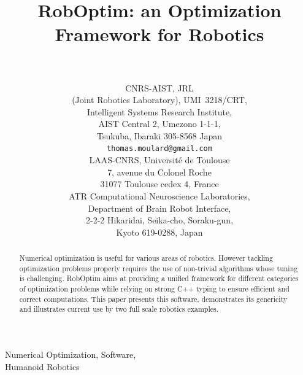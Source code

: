 \documentclass[conference,final,a4paper,twocolumn,9pt]{IEEEtran}
\begin{document}
\title{RobOptim: an Optimization Framework for Robotics}
%
\author{
\\
  \parbox{.32\linewidth}{\centering%
    CNRS-AIST, JRL\\
    (Joint Robotics Laboratory), \mbox{UMI 3218/CRT},\\%
    Intelligent Systems Research Institute,\\%
    AIST Central 2, Umezono 1-1-1,\\%
    Tsukuba, Ibaraki 305-8568 Japan\\%
    \small \texttt{thomas.moulard@gmail.com}}%
  \hspace*{.01\linewidth}
  \parbox{.32\linewidth}{\centering%
    LAAS-CNRS, Universit\'e de Toulouse\\%
    7, avenue du Colonel Roche\\%
    31077 Toulouse cedex 4, France}%
  \hspace*{.01\linewidth}
  \parbox{.32\linewidth}{\centering%
    ATR Computational Neuroscience Laboratories,\\%
    Department of Brain Robot Interface,\\%
    2-2-2 Hikaridai, Seika-cho, Soraku-gun,\\%
    Kyoto 619-0288, Japan}%
}%
%
\maketitle

\begin{abstract}
\boldmath Numerical optimization is useful for various areas of
robotics. However tackling optimization problems properly requires the
use of non-trivial algorithms whose tuning is challenging. RobOptim
aims at providing a unified framework for different categories of
optimization problems while relying on strong C++ typing to ensure
efficient and correct computations. This paper presents this software,
demonstrates its genericity and illustrates current use by two full
scale robotics examples.
\end{abstract}

\begin{IEEEkeywords}
  Numerical Optimization, Software,\\Humanoid Robotics
\end{IEEEkeywords}
\end{document}
